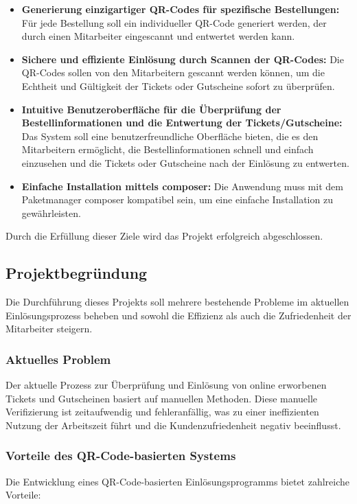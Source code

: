 \begin{itemize}
    \item \textbf{Generierung einzigartiger QR-Codes für spezifische Bestellungen:} Für jede Bestellung soll ein individueller QR-Code generiert werden, der durch einen Mitarbeiter eingescannt und entwertet werden kann.
    \item \textbf{Sichere und effiziente Einlösung durch Scannen der QR-Codes:} Die QR-Codes sollen von den Mitarbeitern gescannt werden können, um die Echtheit und Gültigkeit der Tickets oder Gutscheine sofort zu überprüfen.
    \item \textbf{Intuitive Benutzeroberfläche für die Überprüfung der Bestellinformationen und die Entwertung der Tickets/Gutscheine:} Das System soll eine benutzerfreundliche Oberfläche bieten, die es den Mitarbeitern ermöglicht, die Bestellinformationen schnell und einfach einzusehen und die Tickets oder Gutscheine nach der Einlösung zu entwerten.
	\item \textbf{Einfache Installation mittels composer:} Die Anwendung muss mit dem Paketmanager composer kompatibel sein, um eine einfache Installation zu gewährleisten.
\end{itemize}

Durch die Erfüllung dieser Ziele wird das Projekt erfolgreich abgeschlossen.

\subsection{Projektbegründung} 
\label{sec:Projektbegruendung}

Die Durchführung dieses Projekts soll mehrere bestehende Probleme im aktuellen Einlösungsprozess beheben und sowohl die Effizienz als auch die Zufriedenheit der Mitarbeiter steigern.

\subsubsection{Aktuelles Problem}
Der aktuelle Prozess zur Überprüfung und Einlösung von online erworbenen Tickets und Gutscheinen basiert auf manuellen Methoden. Diese manuelle Verifizierung ist zeitaufwendig und fehleranfällig, was zu einer ineffizienten Nutzung der Arbeitszeit führt und die Kundenzufriedenheit negativ beeinflusst.

\subsubsection{Vorteile des QR-Code-basierten Systems}
Die Entwicklung eines QR-Code-basierten Einlösungsprogramms bietet zahlreiche Vorteile:

